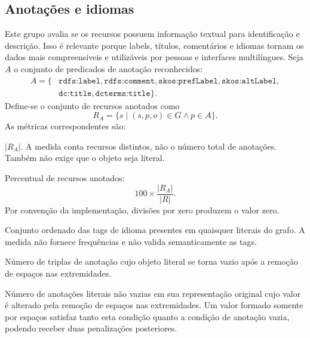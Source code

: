 \documentclass[12pt,a4paper]{article}
\newcommand{\metrica}[1]{\texttt{#1}}
\newcommand{\card}[1]{\left\lvert #1\right\rvert}
\begin{document}
\subsection{Anotações e idiomas}
Este grupo avalia se os recursos possuem informação textual para identificação e descrição. Isso é relevante porque labels, títulos, comentários e idiomas tornam os dados mais compreensíveis e utilizáveis por pessoas e interfaces multilíngues.
Seja \(A\) o conjunto de predicados de anotação reconhecidos:
\begin{align*}
A = \{&\texttt{rdfs:label},\texttt{rdfs:comment},
\texttt{skos:prefLabel},\texttt{skos:altLabel},\\
&\texttt{dc:title},\texttt{dcterms:title}\}.
\end{align*}
Define-se o conjunto de recursos anotados como
\[
R_A = \{s \mid (s,p,o) \in G \land p \in A\}.
\]
As métricas correspondentes são:
\begin{description}[style=nextline]
  \item[\metrica{number\_of\_labels\_or\_comments}]
\(\card{R_A}\). A medida conta recursos distintos, não o número total de anotações. Também não exige que o objeto seja literal.
  \item[\metrica{percentage\_of\_resources\_with\_labels}]
Percentual de recursos anotados:
  \[
100 \times \frac{\card{R_A}}{\card{R}}.
  \]
Por convenção da implementação, divisões por zero produzem o valor zero.
  \item[\metrica{languages}]
Conjunto ordenado das tags de idioma presentes em quaisquer literais do grafo. A medida não fornece frequências e não valida semanticamente as tags.
  \item[\metrica{empty\_annotations}]
Número de triplas de anotação cujo objeto literal se torna vazio após a remoção de espaços nas extremidades.
  \item[\metrica{annotations\_with\_surrounding\_whitespace}]
Número de anotações literais não vazias em sua representação original cujo valor é alterado pela remoção de espaços nas extremidades. Um valor formado somente por espaços satisfaz tanto esta condição quanto a condição de anotação vazia, podendo receber duas penalizações posteriores.
\end{description}
\end{document}
